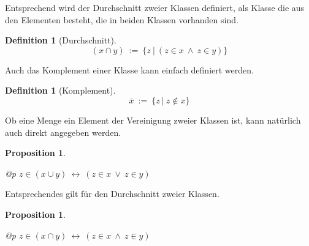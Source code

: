 \documentclass[a4paper,german,10pt,twoside]{book}
\newtheorem{prop}[thm]{Proposition}
\theoremstyle{definition}
\newtheorem{defn}[thm]{Definition}
\theoremstyle{remark}
\begin{document}
\par
Entsprechend wird der Durchschnitt zweier Klassen definiert, als Klasse die aus den Elementen besteht, die in beiden Klassen vorhanden sind.

\begin{defn}[Durchschnitt]
\label{definition:intersection} \hypertarget{definition:intersection}{}
$$(x \cap y)\ := \ \{ z \ | \ (z \in x\ \land \ z \in y) \} $$

\end{defn}




\par
Auch das Komplement einer Klasse kann einfach definiert werden.

\begin{defn}[Komplement]
\label{definition:complement} \hypertarget{definition:complement}{}
$$\overline{x}\ := \ \{ z \ | \ z \notin x \} $$

\end{defn}




\par
Ob eine Menge ein Element der Vereinigung zweier Klassen ist, kann nat{\"u}rlich auch direkt angegeben werden.

\begin{prop}
\label{theorem:unionMember} \hypertarget{theorem:unionMember}{}
\mbox{}
\begin{longtable}{{@{\extracolsep{\fill}}p{\linewidth}}}
\centering $z \in (x \cup y)\ \leftrightarrow \ (z \in x\ \lor \ z \in y)$
\end{longtable}

\end{prop}




\par
Entsprechendes gilt f{\"u}r den Durchschnitt zweier Klassen.

\begin{prop}
\label{theorem:intersectionMember} \hypertarget{theorem:intersectionMember}{}
\mbox{}
\begin{longtable}{{@{\extracolsep{\fill}}p{\linewidth}}}
\centering $z \in (x \cap y)\ \leftrightarrow \ (z \in x\ \land \ z \in y)$
\end{longtable}

\end{prop}
\end{document}

